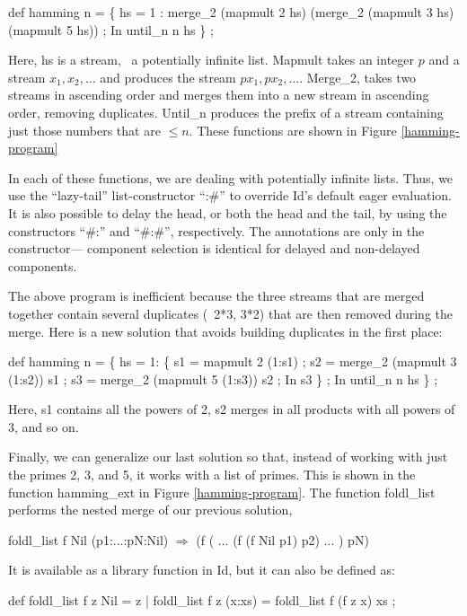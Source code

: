  \beginid
def hamming n =
    \{ hs = 1 : merge\_2 (mapmult 2 hs)
                       (merge\_2 (mapmult 3 hs)
                                (mapmult 5 hs)) ;
     In
       until\_n n hs \} ;
 \endid

Here, {\cf hs} is a stream, \ie\ a potentially infinite list.  {\cf
Mapmult} takes an integer $p$ and a stream $x_1,x_2,\ldots$ and
produces the stream $px_1,px_2,\ldots$.  {\cf Merge\_2}, takes two
streams in ascending order and merges them into a new stream in
ascending order, removing duplicates. {\cf Until\_n} produces the
prefix of a stream containing just those numbers that are $\leq n$.
These functions are shown in Figure \ref{hamming-program}

In each of these functions, we are dealing with potentially infinite
lists.  Thus, we use the ``lazy-tail'' list-constructor ``{\cf :\#}''
to override Id's default eager evaluation.  It is also possible to
delay the head, or both the head and the tail, by using the
constructors ``{\cf \#:}'' and ``{\cf \#:\#}'', respectively.  The
annotations are only in the constructor--- component selection is
identical for delayed and non-delayed components.

The above program is inefficient because the three streams that are
merged together contain several duplicates (\eg\ 2*3, 3*2) that are
then removed during the merge.  Here is a new solution that avoids
building duplicates in the first place:

 \beginid
def hamming n =
    \{ hs = 1: \{  s1 = mapmult 2 (1:s1) ;
                 s2 = merge\_2 (mapmult 3 (1:s2)) s1 ;
                 s3 = merge\_2 (mapmult 5 (1:s3)) s2 ;
               In
                 s3 \} ;
    In
      until\_n n hs \} ;
 \endid

Here, {\cf s1} contains all the powers of 2, {\cf s2} merges in all
products with all powers of 3, and so on.

Finally, we can generalize our last solution so that, instead of
working with just the primes 2, 3, and 5, it works with a list of
primes.  This is shown in the function {\cf hamming\_ext} in Figure
\ref{hamming-program}.  The function {\cf foldl\_list} performs
the nested merge of our previous solution, \ie\

 \beginid
foldl\_list f Nil (p1:...:pN:Nil) $\Rightarrow$ (f ( ... (f (f Nil p1) p2) ... ) pN)
 \endid

It is available as a library function in Id, but it can also be
defined as:

 \beginid
def foldl\_list f z Nil    = z
 |  foldl\_list f z (x:xs) = foldl\_list f (f z x) xs ;
 \endid

